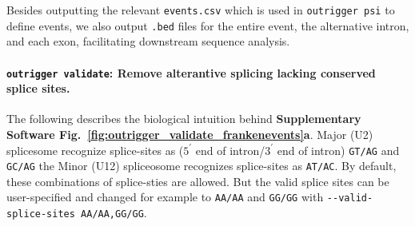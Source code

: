 Besides outputting the relevant \texttt{events.csv} which is used in \texttt{outrigger psi} to define events, we also output \texttt{.bed} files for the entire event, the alternative intron, and each exon, facilitating downstream sequence analysis.





\paragraph{\texttt{outrigger validate}: Remove alterantive splicing lacking conserved splice sites.} The following describes the biological intuition behind \textbf{Supplementary Software Fig.~\ref{fig:outrigger_validate_frankenevents}a}. Major (U2) splicesome recognize splice-sites as  ($5^\prime$ end of intron/$3^\prime$ end of intron) \texttt{GT/AG} and \texttt{GC/AG} the Minor (U12) spliceosome recognizes splice-sites as \texttt{AT/AC}\cite{McManus:2011en,GarciaBlanco:2004kl}. By default, these combinations of splice-sties are allowed. But the valid splice sites can be user-specified and changed for example to \texttt{AA/AA} and \texttt{GG/GG} with \texttt{-{}-valid-splice-sites~AA/AA,GG/GG}.

